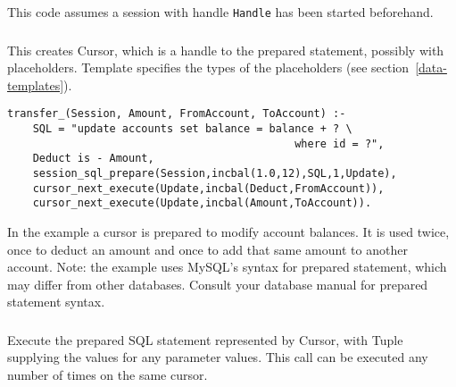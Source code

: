 This code assumes a session with handle {\tt Handle} has been started beforehand.

\subsubsection{}
\label{session-sql-prepare/4}

This creates Cursor, which is a handle to the prepared statement,
possibly with placeholders. Template specifies the types of the placeholders 
(see section~\ref{data-templates}). 

\begin{verbatim}
transfer_(Session, Amount, FromAccount, ToAccount) :-
    SQL = "update accounts set balance = balance + ? \
                                             where id = ?",
    Deduct is - Amount,
    session_sql_prepare(Session,incbal(1.0,12),SQL,1,Update),
    cursor_next_execute(Update,incbal(Deduct,FromAccount)),
    cursor_next_execute(Update,incbal(Amount,ToAccount)).
\end{verbatim}
In the example a cursor is prepared to modify account balances. It is used
twice, once to deduct an amount and once to add that same amount to
another account. Note: the example uses MySQL's syntax for prepared
statement, which may differ from other databases. Consult your database manual for
prepared statement syntax.

\subsubsection{}
\label{cursor-next-execute/2}

Execute the prepared SQL statement represented by Cursor, with Tuple
supplying the values for any parameter values.
This call can be executed any number of times on the same cursor.

\subsubsection
{}
\label{cursor-all-execute/2}

